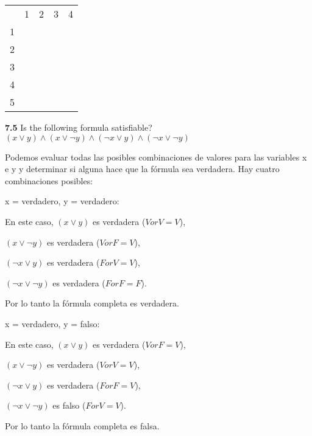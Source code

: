 \documentclass{article}
\begin{document}
%

\begin{center}
\begin{tabular}{ccccc}
     & 1 & 2 & 3 & 4 \\
   1 &  &  &  &  \\
   2 &  &  &  &  \\
   3 &  &  &  &  \\
   4 &  &  &  &  \\
   5 &  &  &  &  
\end{tabular}
\end{center}

\textbf{7.5} Is the following formula satisfiable?
$ (x \lor y) \land (x \lor \neg{y}) \land (\neg{x} \lor y) \land (\neg{x} \lor
\neg{y}) $

Podemos evaluar todas las posibles combinaciones de valores para las variables x
e y y determinar si alguna hace que la fórmula sea verdadera. Hay cuatro
combinaciones posibles:

    x = verdadero, y = verdadero:
    
    En este caso, 
    $ (x \lor y)$ es verdadera ($V or V = V$),

    $(x \lor \neg{y})$ es verdadera ($V or F = V$),

    $(\neg{x} \lor y)$ es verdadera ($F or V = V$),

    $(\neg{x} \lor \neg{y})$ es verdadera ($F or F = F$).

    Por lo tanto la fórmula completa es verdadera.

    x = verdadero, y = falso:
    
    En este caso, 
    $ (x \lor y)$ es verdadera ($V or F = V$),

    $(x \lor \neg{y})$ es verdadera ($V or V = V$),

    $(\neg{x} \lor y)$ es verdadera ($F or F = V$),

    $(\neg{x} \lor \neg{y})$ es falso ($F or V = V$).

    Por lo tanto la fórmula completa es falsa.
\end{document}
